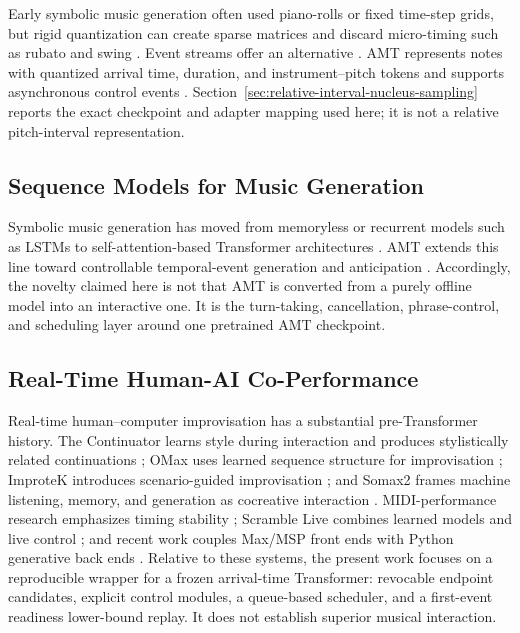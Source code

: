 \documentclass[11pt,a4paper]{article}
\begin{document}
Early symbolic music generation often used piano-rolls or fixed time-step grids, but rigid quantization can create sparse matrices and discard micro-timing such as rubato and swing \citep{boulanger2012modeling}. Event streams offer an alternative \citep{oore2020feeling,huang2018musictransformer}. AMT represents notes with quantized arrival time, duration, and instrument--pitch tokens and supports asynchronous control events \citep{thickstun2023amt}. Section~\ref{sec:relative-interval-nucleus-sampling} reports the exact checkpoint and adapter mapping used here; it is not a relative pitch-interval representation.

\subsection{Sequence Models for Music Generation}

Symbolic music generation has moved from memoryless or recurrent models such as LSTMs \citep{eck2002finding} to self-attention-based Transformer architectures \citep{vaswani2017attention,huang2018musictransformer}. AMT extends this line toward controllable temporal-event generation and anticipation \citep{thickstun2023amt}. Accordingly, the novelty claimed here is not that AMT is converted from a purely offline model into an interactive one. It is the turn-taking, cancellation, phrase-control, and scheduling layer around one pretrained AMT checkpoint.

\subsection{Real-Time Human-AI Co-Performance}

Real-time human--computer improvisation has a substantial pre-Transformer history. The Continuator learns style during interaction and produces stylistically related continuations \citep{pachet2003continuator}; OMax uses learned sequence structure for improvisation \citep{assayag2006omax}; ImproteK introduces scenario-guided improvisation \citep{nika2016improtek}; and Somax2 frames machine listening, memory, and generation as cocreative interaction \citep{assayag2022somax2}. MIDI-performance research emphasizes timing stability \citep{nelson2004midi}; Scramble Live combines learned models and live control \citep{privato2022scramble}; and recent work couples Max/MSP front ends with Python generative back ends \citep{karchkhadze2026towards}. Relative to these systems, the present work focuses on a reproducible wrapper for a frozen arrival-time Transformer: revocable endpoint candidates, explicit control modules, a queue-based scheduler, and a first-event readiness lower-bound replay. It does not establish superior musical interaction.
\end{document}

